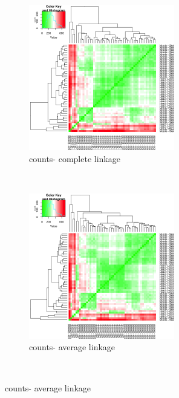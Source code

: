     
    \begin{figure}[ht]
    \centering
    \begin{subfigure}[t]{0.5\textwidth}
        \centering
        \includegraphics[height=2.5in]{../plots/heart_muscle_hierarchical_heatmap_complete.png}
        \caption{counts- complete linkage}
    \end{subfigure}%
    ~ 
    \begin{subfigure}[t]{0.5\textwidth}
        \centering
        \includegraphics[height=2.5in]{../plots/heart_muscle_hierarchical_heatmap_average.png}
        \caption{counts- average linkage}
    \end{subfigure} \\
    

\end{figure}
